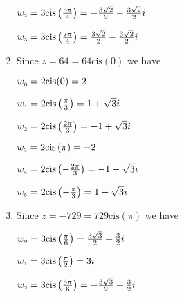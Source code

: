 \begin{enumerate}
\begin{multicols}{2}
\end{multicols}

\begin{multicols}{2}

$w_{\text{\tiny$2$}} = 3\text{cis}\left(\frac{5\pi}{4}\right) =-\frac{3\sqrt{2}}{2} - \frac{3\sqrt{2}}{2}i$

$w_{\text{\tiny$3$}} = 3\text{cis}\left(\frac{7\pi}{4}\right) =\frac{3\sqrt{2}}{2} - \frac{3\sqrt{2}}{2}i$

\end{multicols}





\item Since $z = 64 = 64\text{cis}(0)$ we have 


\begin{multicols}{3}

$w_{\text{\tiny$0$}} = 2\text{cis}(0) = 2$

$w_{\text{\tiny$1$}} = 2\text{cis}\left(\frac{\pi}{3}\right) = 1 + \sqrt{3}i$

$w_{\text{\tiny$2$}} = 2\text{cis}\left(\frac{2\pi}{3}\right) = -1 + \sqrt{3}i$

\end{multicols}

\begin{multicols}{3}

$w_{\text{\tiny$3$}} = 2\text{cis}\left(\pi\right) = -2$

$w_{\text{\tiny$4$}} = 2\text{cis}\left(-\frac{2\pi}{3}\right) = -1 - \sqrt{3}i$

$w_{\text{\tiny$5$}} = 2\text{cis}\left(-\frac{\pi}{3}\right) = 1 - \sqrt{3}i$

\end{multicols}


\item Since $z = -729 = 729 \text{cis}(\pi)$ we have 


\begin{multicols}{3}

$w_{\text{\tiny$0$}} = 3\text{cis}\left(\frac{\pi}{6}\right) = \frac{3\sqrt{3}}{2} + \frac{3}{2}i$

$w_{\text{\tiny$1$}} = 3\text{cis}\left(\frac{\pi}{2}\right) = 3i$

$w_{\text{\tiny$2$}} = 3\text{cis}\left(\frac{5\pi}{6}\right) = -\frac{3\sqrt{3}}{2} + \frac{3}{2}i$

\end{multicols}

\begin{multicols}{3}


\end{multicols}
\end{enumerate}

